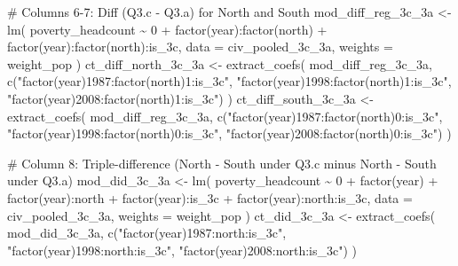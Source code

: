 \documentclass[
  letterpaper,
  DIV=11,
  numbers=noendperiod]{scrartcl}
\newenvironment{Shaded}{\begin{snugshade}}{\end{snugshade}}
\newcommand{\AttributeTok}[1]{\textcolor[rgb]{0.40,0.45,0.13}{#1}}
\newcommand{\CommentTok}[1]{\textcolor[rgb]{0.37,0.37,0.37}{#1}}
\newcommand{\DecValTok}[1]{\textcolor[rgb]{0.68,0.00,0.00}{#1}}
\newcommand{\FunctionTok}[1]{\textcolor[rgb]{0.28,0.35,0.67}{#1}}
\newcommand{\NormalTok}[1]{\textcolor[rgb]{0.00,0.23,0.31}{#1}}
\newcommand{\OtherTok}[1]{\textcolor[rgb]{0.00,0.23,0.31}{#1}}
\newcommand{\SpecialCharTok}[1]{\textcolor[rgb]{0.37,0.37,0.37}{#1}}
\newcommand{\StringTok}[1]{\textcolor[rgb]{0.13,0.47,0.30}{#1}}
\begin{document}
\begin{Shaded}
\begin{Highlighting}[]
\CommentTok{\# Columns 6{-}7: Diff (Q3.c {-} Q3.a) for North and South}
\NormalTok{mod\_diff\_reg\_3c\_3a }\OtherTok{\textless{}{-}} \FunctionTok{lm}\NormalTok{(}
\NormalTok{  poverty\_headcount }\SpecialCharTok{\textasciitilde{}} \DecValTok{0} \SpecialCharTok{+} \FunctionTok{factor}\NormalTok{(year)}\SpecialCharTok{:}\FunctionTok{factor}\NormalTok{(north) }\SpecialCharTok{+} \FunctionTok{factor}\NormalTok{(year)}\SpecialCharTok{:}\FunctionTok{factor}\NormalTok{(north)}\SpecialCharTok{:}\NormalTok{is\_3c,}
  \AttributeTok{data =}\NormalTok{ civ\_pooled\_3c\_3a, }\AttributeTok{weights =}\NormalTok{ weight\_pop}
\NormalTok{)}
\NormalTok{ct\_diff\_north\_3c\_3a }\OtherTok{\textless{}{-}} \FunctionTok{extract\_coefs}\NormalTok{(}
\NormalTok{  mod\_diff\_reg\_3c\_3a,}
  \FunctionTok{c}\NormalTok{(}\StringTok{"factor(year)1987:factor(north)1:is\_3c"}\NormalTok{,}
    \StringTok{"factor(year)1998:factor(north)1:is\_3c"}\NormalTok{,}
    \StringTok{"factor(year)2008:factor(north)1:is\_3c"}\NormalTok{)}
\NormalTok{)}
\NormalTok{ct\_diff\_south\_3c\_3a }\OtherTok{\textless{}{-}} \FunctionTok{extract\_coefs}\NormalTok{(}
\NormalTok{  mod\_diff\_reg\_3c\_3a,}
  \FunctionTok{c}\NormalTok{(}\StringTok{"factor(year)1987:factor(north)0:is\_3c"}\NormalTok{,}
    \StringTok{"factor(year)1998:factor(north)0:is\_3c"}\NormalTok{,}
    \StringTok{"factor(year)2008:factor(north)0:is\_3c"}\NormalTok{)}
\NormalTok{)}

\CommentTok{\# Column 8: Triple{-}difference (North {-} South under Q3.c minus North {-} South under Q3.a)}
\NormalTok{mod\_did\_3c\_3a }\OtherTok{\textless{}{-}} \FunctionTok{lm}\NormalTok{(}
\NormalTok{  poverty\_headcount }\SpecialCharTok{\textasciitilde{}} \DecValTok{0} \SpecialCharTok{+} \FunctionTok{factor}\NormalTok{(year) }\SpecialCharTok{+} \FunctionTok{factor}\NormalTok{(year)}\SpecialCharTok{:}\NormalTok{north }\SpecialCharTok{+}
    \FunctionTok{factor}\NormalTok{(year)}\SpecialCharTok{:}\NormalTok{is\_3c }\SpecialCharTok{+} \FunctionTok{factor}\NormalTok{(year)}\SpecialCharTok{:}\NormalTok{north}\SpecialCharTok{:}\NormalTok{is\_3c,}
  \AttributeTok{data =}\NormalTok{ civ\_pooled\_3c\_3a, }\AttributeTok{weights =}\NormalTok{ weight\_pop}
\NormalTok{)}
\NormalTok{ct\_did\_3c\_3a }\OtherTok{\textless{}{-}} \FunctionTok{extract\_coefs}\NormalTok{(}
\NormalTok{  mod\_did\_3c\_3a,}
  \FunctionTok{c}\NormalTok{(}\StringTok{"factor(year)1987:north:is\_3c"}\NormalTok{,}
    \StringTok{"factor(year)1998:north:is\_3c"}\NormalTok{,}
    \StringTok{"factor(year)2008:north:is\_3c"}\NormalTok{)}
\NormalTok{)}


\end{Highlighting}
\end{Shaded}
\end{document}
